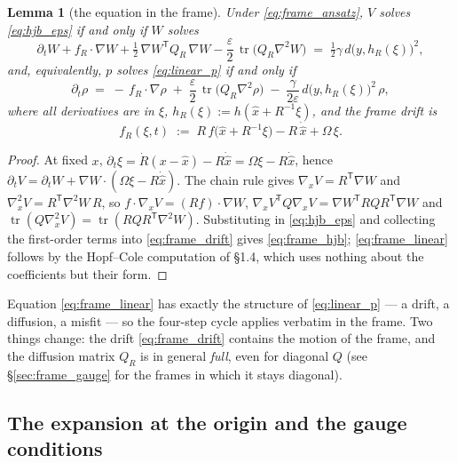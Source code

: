 \documentclass[11pt,a4paper]{article}
\newcommand{\tr}{\operatorname{tr}}
\newcommand{\T}{^{\mathsf T}}
\newcommand{\xh}{\hat{x}}
\newcommand{\eps}{\varepsilon}
\newcommand{\grad}{\nabla}
\theoremstyle{plain}
\newtheorem{lemma}{Lemma}
\theoremstyle{definition}
\theoremstyle{remark}
\begin{document}
\begin{lemma}[the equation in the frame]
Under \eqref{eq:frame_ansatz}, $V$ solves \eqref{eq:hjb_eps} if and only if $W$ solves
\begin{equation}
  \partial_tW + f_R\cdot\grad W + \tfrac12\,\grad W\T Q_R\,\grad W - \frac\eps2\,\tr\big(Q_R\grad^2W\big) \;=\; \tfrac12\gamma\, d\big(y,h_R(\xi)\big)^2,
  \label{eq:frame_hjb}
\end{equation}
and, equivalently, $p$ solves \eqref{eq:linear_p} if and only if
\begin{equation}
  \partial_t\rho \;=\; -\,f_R\cdot\grad\rho \;+\; \frac\eps2\,\tr\big(Q_R\grad^2\rho\big) \;-\; \frac{\gamma}{2\eps}\,d\big(y,h_R(\xi)\big)^2\,\rho ,
  \label{eq:frame_linear}
\end{equation}
where all derivatives are in $\xi$, $h_R(\xi) := h(\xh + R^{-1}\xi)$, and the \emph{frame drift} is
\begin{equation}
  f_R(\xi,t) \;:=\; R\,f\big(\xh + R^{-1}\xi\big) - R\,\dot{\xh} + \Omega\,\xi .
  \label{eq:frame_drift}
\end{equation}
\end{lemma}
\begin{proof}
At fixed $x$, $\partial_t\xi = \dot R(x-\xh) - R\dot{\xh} = \Omega\xi - R\dot{\xh}$, hence $\partial_tV = \partial_tW + \grad W\cdot(\Omega\xi - R\dot{\xh})$. The chain rule gives $\grad_xV = R\T\grad W$ and $\grad_x^2V = R\T\grad^2W\,R$, so $f\cdot\grad_xV = (Rf)\cdot\grad W$, $\grad_xV\T Q\grad_xV = \grad W\T RQR\T\grad W$ and $\tr(Q\grad_x^2V) = \tr(RQR\T\grad^2W)$. Substituting in \eqref{eq:hjb_eps} and collecting the first-order terms into \eqref{eq:frame_drift} gives \eqref{eq:frame_hjb}; \eqref{eq:frame_linear} follows by the Hopf--Cole computation of \S1.4, which uses nothing about the coefficients but their form.
\end{proof}

Equation \eqref{eq:frame_linear} has exactly the structure of \eqref{eq:linear_p} --- a drift, a diffusion, a misfit --- so the four-step cycle applies verbatim in the frame. Two things change: the drift \eqref{eq:frame_drift} contains the motion of the frame, and the diffusion matrix $Q_R$ is in general \emph{full}, even for diagonal $Q$ (see \S\ref{sec:frame_gauge} for the frames in which it stays diagonal).

\subsection{The expansion at the origin and the gauge conditions}
\label{sec:frame_expansion}
\end{document}

